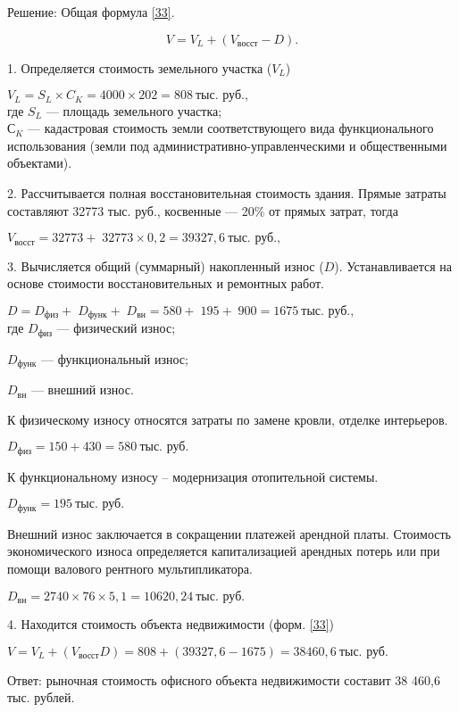 Решение: Общая формула \ref{33}.

\begin{equation}\label{33}
V = V_L + (V_\text{восст} - D).
\end{equation}

1. Определяется стоимость земельного участка ($V_L$)

$ V_L = S_L \times C_K = 4000 \times 202 = 808\ \text{тыс. руб.}, $\\
где $ S_L $ --- площадь земельного участка;\\
$ С_K $ --- кадастровая стоимость земли соответствующего вида функционального использования (земли под административно-управленческими и общественными объектами).

2. Рассчитывается полная восстановительная стоимость здания.
Прямые затраты составляют 32773 тыс. руб., косвенные --- 20\% от прямых затрат, тогда

$ V_\text{восст} = 32773 + 32773 \times 0,2 = 39327,6\ \text{тыс. руб.}, $

3. Вычисляется общий (суммарный) накопленный износ ($ D $).
Устанавливается на основе стоимости восстановительных и ремонтных работ.

$ D = D_\text{физ} +  D_\text{функ} + D_\text{вн} = 580 + 195 + 900 = 1675\ \text{тыс. руб.}, $\\
где $D_\text{физ}$ --- физический износ;

$ D_\text{функ} $ --- функциональный износ;

$ D_\text{вн} $ --- внешний износ.

К физическому износу относятся затраты по замене кровли, отделке интерьеров.

$ D_\text{физ} = 150 + 430 = 580\ \text{тыс. руб.} $

К функциональному износу – модернизация отопительной системы.

$ D_\text{функ} = 195\ \text{тыс. руб.} $

Внешний износ заключается в сокращении платежей арендной платы.
Стоимость экономического износа определяется капитализацией арендных потерь или при помощи валового рентного мультипликатора.

$ D_ \text{вн} = 2740 \times 76 \times 5,1 = 10620,24\ \text{тыс. руб.} $

4. Находится стоимость объекта недвижимости (форм. \ref{33})

$V = V_L + (V_\text{восст} D) = 808 +(39327,6 - 1675) = 38460,6\ \text{тыс. руб.} $

Ответ: рыночная стоимость офисного объекта недвижимости составит 38 460,6 тыс. рублей.











